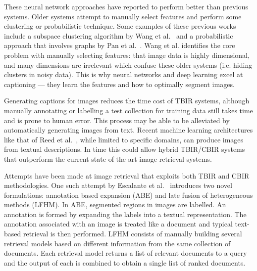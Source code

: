 These neural network approaches have reported to perform better than previous systems. Older systems attempt to manually select features and perform some clustering or probabilistic technique. Some examples of these previous works include a subspace clustering algorithm by Wang et al.~\cite{wang2004automatic} and a probabilistic approach that involves graphs by Pan et al.~\cite{pan2004gcap}. Wang et al. identifies the core problem with manually selecting features: that image data is highly dimensional, and many dimensions are irrelevant which confuse these older systems (i.e. hiding clusters in noisy data). This is why neural networks and deep learning excel at captioning --- they learn the features and how to optimally segment images.

Generating captions for images reduces the time cost of TBIR systems, although manually annotating or labelling a test collection for training data still takes time and is prone to human error. This process may be able to be alleviated by automatically generating images from text. Recent machine learning architectures like that of Reed et al.~\cite{reed2016generative}, while limited to specific domains, can produce images from textual descriptions. In time this could allow hybrid TBIR/CBIR systems that outperform the current state of the art image retrieval systems.

Attempts have been made at image retrieval that exploits both TBIR and CBIR methodologies. One such attempt by Escalante et al.~\cite{escalante2007towards} introduces two novel formulations: annotation based expansion (ABE) and late fusion of heterogeneous methods (LFHM). In ABE, segmented regions in images are labelled. An annotation is formed by expanding the labels into a textual representation. The annotation associated with an image is treated like a document and typical text-based retrieval is then performed. LFHM consists of manually building several retrieval models based on different information from the same collection of documents. Each retrieval model returns a list of relevant documents to a query and the output of each is combined to obtain a single list of ranked documents.

